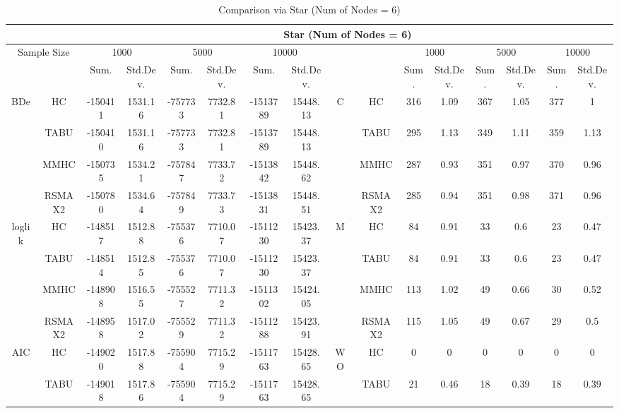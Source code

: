 \begin{table}[p]																										
\centering	\caption{Comparison via Star (Num of Nodes = 6)}	\tiny																						
{\tabcolsep=0.01in																										
\begin{tabular}{cc||cc|cc|cc||cc|cc|cc|cc}																										
\hline																										
&	&	\multicolumn{14}{c}{Star	(Num	of	Nodes	=	6)}\tabularnewline																			
\hline																										
\multicolumn{2}{c||}{Sample	Size}	&	\multicolumn{2}{c|}{1000}	&	\multicolumn{2}{c|}{5000}	&	\multicolumn{2}{c||}{10000}	&	&	&	\multicolumn{2}{c|}{1000}	&	\multicolumn{2}{c|}{5000}	&	\multicolumn{2}{c}{10000}\tabularnewline											
\hline																										
&	&	Sum.	&	Std.Dev.	&	Sum.	&	Std.Dev.	&	Sum.	&	Std.Dev.	&	&	&	Sum.	&	Std.Dev.	&	Sum.	&	Std.Dev.	&	Sum.	&	Std.Dev.\tabularnewline
\hline																										
\hline																										
\multirow{4}{*}{BDe} & HC &	-150411 & 	1531.16 & 	-757733 & 	7732.81 & 	-1513789 & 	15448.13 & 	\multirow{4}{*}{C} & HC &	316 & 	1.09 & 	367 & 	1.05 & 	377 & 	1\tabularnewline													
& TABU &	-150410 & 	1531.16 & 	-757733 & 	7732.81 & 	-1513789 & 	15448.13 & 	& TABU &	295 & 	1.13 & 	349 & 	1.11 & 	359 & 	1.13\tabularnewline													
& MMHC &	-150735 & 	1534.21 & 	-757847 & 	7733.72 & 	-1513842 & 	15448.62 & 	& MMHC &	287 & 	0.93 & 	351 & 	0.97 & 	370 & 	0.96\tabularnewline													
& RSMAX2 &	-150780 & 	1534.64 & 	-757849 & 	7733.73 & 	-1513831 & 	15448.51 & 	& RSMAX2 &	285 & 	0.94 & 	351 & 	0.98 & 	371 & 	0.96\tabularnewline													
\hline																										
\multirow{4}{*}{loglik} & HC &	-148517 & 	1512.88 & 	-755376 & 	7710.07 & 	-1511230 & 	15423.37 & 	\multirow{4}{*}{M} & HC &	84 & 	0.91 & 	33 & 	0.6 & 	23 & 	0.47\tabularnewline													
& TABU &	-148514 & 	1512.85 & 	-755376 & 	7710.07 & 	-1511230 & 	15423.37 & 	& TABU &	84 & 	0.91 & 	33 & 	0.6 & 	23 & 	0.47\tabularnewline													
& MMHC &	-148908 & 	1516.55 & 	-755527 & 	7711.32 & 	-1511302 & 	15424.05 & 	& MMHC &	113 & 	1.02 & 	49 & 	0.66 & 	30 & 	0.52\tabularnewline													
& RSMAX2 &	-148958 & 	1517.02 & 	-755529 & 	7711.32 & 	-1511288 & 	15423.91 & 	& RSMAX2 &	115 & 	1.05 & 	49 & 	0.67 & 	29 & 	0.5\tabularnewline													
\hline																										
\multirow{4}{*}{AIC} & HC &	-149020 & 	1517.88 & 	-755904 & 	7715.29 & 	-1511763 & 	15428.65 & 	\multirow{4}{*}{WO} & HC &	0 & 	0 & 	0 & 	0 & 	0 & 	0\tabularnewline													
& TABU &	-149018 & 	1517.86 & 	-755904 & 	7715.29 & 	-1511763 & 	15428.65 & 	& TABU &	21 & 	0.46 & 	18 & 	0.39 & 	18 & 	0.39\tabularnewline													

\end{tabular}}
\end{table}
